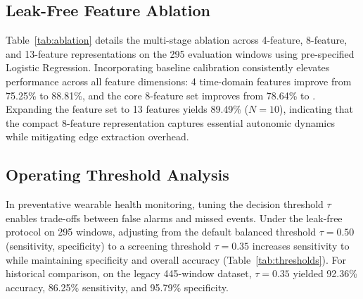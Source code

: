 \documentclass[preprint,12pt,3p]{elsarticle}
\begin{document}
\begin{table}[t]
\centering
\caption{Impact of Baseline Calibration Length on Leak-Free Evaluation ($N_{\text{eval}}=295$ Common Windows, 15 Subjects, $\tau = 0.50$)}
\label{tab:calibration_length}

\end{table}

\subsection{Leak-Free Feature Ablation}
Table~\ref{tab:ablation} details the multi-stage ablation across 4-feature, 8-feature, and 13-feature representations on the 295 evaluation windows using pre-specified Logistic Regression. Incorporating baseline calibration consistently elevates performance across all feature dimensions: 4 time-domain features improve from 75.25\% to 88.81\%, and the core 8-feature set improves from 78.64\% to \valNtenAccPct. Expanding the feature set to 13 features yields 89.49\% ($N=10$), indicating that the compact 8-feature representation captures essential autonomic dynamics while mitigating edge extraction overhead.

\begin{table}[t]
\centering
\caption{Leak-Free Model Progression and Feature Ablation ($N_{\text{eval}} = 295$ Windows, $N=10$ Calibration, $\tau=0.50$)}
\label{tab:ablation}

\end{table}

\subsection{Operating Threshold Analysis}
In preventative wearable health monitoring, tuning the decision threshold $\tau$ enables trade-offs between false alarms and missed events. Under the leak-free protocol on 295 windows, adjusting from the default balanced threshold $\tau = 0.50$ (\valNtenSensPct sensitivity, \valNtenSpecPct specificity) to a screening threshold $\tau = 0.35$ increases sensitivity to \valTauThirtyFiveSensPct while maintaining \valTauThirtyFiveSpecPct specificity and \valTauThirtyFiveAccPct overall accuracy (Table~\ref{tab:thresholds}). For historical comparison, on the legacy 445-window dataset, $\tau = 0.35$ yielded 92.36\% accuracy, 86.25\% sensitivity, and 95.79\% specificity.

\begin{table}[t]
\centering
\caption{Decision Threshold Sensitivity Comparison}
\label{tab:thresholds}

\end{table}
\end{document}
